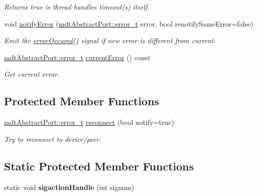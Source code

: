 \begin{DoxyCompactItemize}
\begin{DoxyCompactList}\small\item\em Returns true is thread handles timeout(s) itself. \end{DoxyCompactList}\item 
void \hyperlink{classmdt_port_thread_a30bdd11ef16d4f3321921c9d9b26399d}{notifyError} (\hyperlink{classmdt_abstract_port_ad4121bb930c95887e77f8bafa065a85e}{mdtAbstractPort::error\_\-t} error, bool renotifySameError=false)
\begin{DoxyCompactList}\small\item\em Emit the \hyperlink{classmdt_port_thread_ab31cbe1a85aa830cd368654d1f806326}{errorOccured()} signal if new error is different from current. \end{DoxyCompactList}\item 
\hyperlink{classmdt_abstract_port_ad4121bb930c95887e77f8bafa065a85e}{mdtAbstractPort::error\_\-t} \hyperlink{classmdt_port_thread_adbc2d86162c23401e75184407b8c9428}{currentError} () const 
\begin{DoxyCompactList}\small\item\em Get current error. \end{DoxyCompactList}\end{DoxyCompactItemize}
\subsection*{Protected Member Functions}
\begin{DoxyCompactItemize}
\item 
\hyperlink{classmdt_abstract_port_ad4121bb930c95887e77f8bafa065a85e}{mdtAbstractPort::error\_\-t} \hyperlink{classmdt_port_thread_abee1d2f9b67ca37cfd13e108ca978b36}{reconnect} (bool notify=true)
\begin{DoxyCompactList}\small\item\em Try to reconnect to device/peer. \end{DoxyCompactList}\end{DoxyCompactItemize}
\subsection*{Static Protected Member Functions}
\begin{DoxyCompactItemize}
\item 
\hypertarget{classmdt_port_thread_a01d2362e0dfcece4cba242cb586d8d1c}{
static void {\bfseries sigactionHandle} (int signum)}
\label{classmdt_port_thread_a01d2362e0dfcece4cba242cb586d8d1c}

\end{DoxyCompactItemize}
